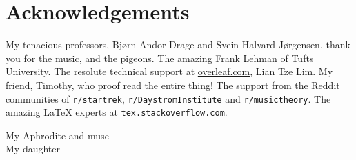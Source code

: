 
\thispagestyle{empty}
\chapter*{Acknowledgements}

\begin{fullwidth}
My tenacious professors, Bjørn Andor Drage and Svein-Halvard Jørgensen, thank you for the music, and the pigeons.
The amazing Frank Lehman of Tufts University. 
The resolute technical support at \url{overleaf.com}, Lian Tze Lim. 
My friend, Timothy, who proof read the entire thing!
The support from the Reddit communities of \texttt{r/startrek}, \texttt{r/DaystromInstitute} and \texttt{r/musictheory}.
The amazing \LaTeX{} experts at \texttt{tex.stackoverflow.com}.

\vspace{0.5cm}

\noindent My Aphrodite and muse
\\
\noindent My daughter

\end{fullwidth}



